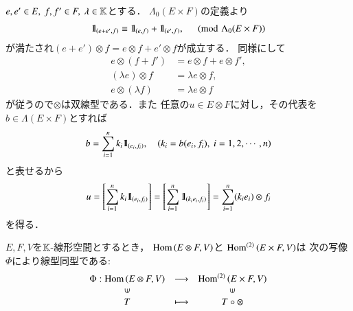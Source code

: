 	\begin{prf}
		$e,e' \in E,\ f,f' \in F,\ \lambda \in \mathbb{K}$とする．
		$\Lambda_0(E \times F)$の定義より
		\begin{align}
			\mbox{1}\hspace{-0.25em}\mbox{l}_{(e+e',f)} \equiv \mbox{1}\hspace{-0.25em}\mbox{l}_{(e,f)}+\mbox{1}\hspace{-0.25em}\mbox{l}_{(e',f)},
			\quad \pmod{\Lambda_0(E \times F)}
		\end{align}
		が満たされ$(e + e') \otimes f = e \otimes f + e' \otimes f$が成立する．
		同様にして
		\begin{align}
			e \otimes (f+f') &= e \otimes f + e \otimes f', \\
			(\lambda e) \otimes f &= \lambda e \otimes f, \\
			e \otimes (\lambda f) &= \lambda e \otimes f
		\end{align}
		が従うので$\otimes$は双線型である．また
		任意の$u \in E \otimes F$に対し，その代表を$b \in \Lambda(E \times F)$とすれば
		\begin{align}
			b = \sum_{i=1}^n k_i \mbox{1}\hspace{-0.25em}\mbox{l}_{(e_i,f_i)},
			\quad \left( k_i = b(e_i,f_i),\ i=1,2,\cdots,n \right)
		\end{align}
		と表せるから
		\begin{align}
			u = \left[ \sum_{i=1}^n k_i \mbox{1}\hspace{-0.25em}\mbox{l}_{(e_i,f_i)} \right]
			= \left[ \sum_{i=1}^n \mbox{1}\hspace{-0.25em}\mbox{l}_{(k_i e_i,f_i)} \right]
			= \sum_{i=1}^n (k_i e_i) \otimes f_i
		\end{align}
		を得る．
		\QED
	\end{prf}
	
	\begin{screen}
		\begin{thm}[テンソル積の普遍性]
			$E,F,V$を$\mathbb{K}$-線形空間とするとき，
			$\mathrm{Hom} \left(E \otimes F,V\right)$と
			$\mathrm{Hom}^{(2)} \left(E \times F,V\right)$は
			次の写像$\Phi$により線型同型である:
			\begin{align}
				\begin{array}{ccc}
					\Phi:\Hom{E \otimes F}{V} & \longrightarrow & \Bilin{E \times F}{V} \\
					\rotatebox{90}{$\in$} & & \rotatebox{90}{$\in$} \\
					T & \longmapsto & T \circ \otimes
				\end{array}
			\end{align}
		\end{thm}
	\end{screen}
	
